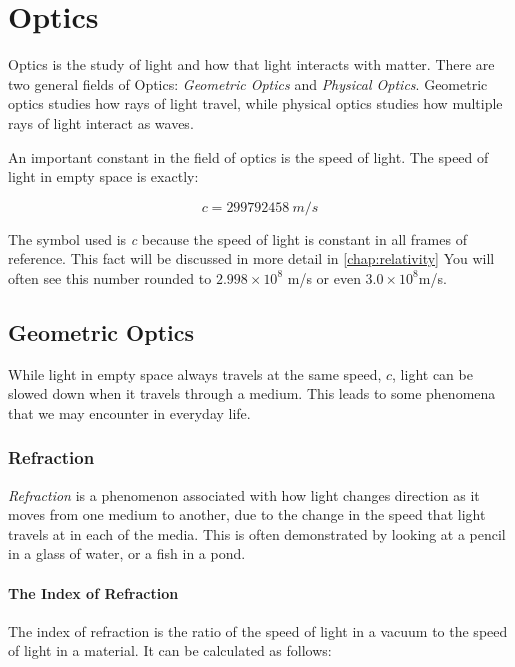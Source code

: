 \chapter{Optics}
	 Optics is the study of light and how that light interacts with matter.  There are two general fields of Optics: \textit{Geometric Optics} and \textit{Physical Optics}. Geometric optics studies how rays of light travel, while physical optics studies how multiple rays of light interact as waves.  
	
	An important constant in the field of optics is the speed of light.  The speed of light in empty space is exactly:	
	\begin{mdframed}[backgroundcolor=green!20!white]
		\begin{equation*}
		c = \SI{299792458}{m/s}
		\label{equation:speedoflight}
		\end{equation*}
	\end{mdframed}	
	
	The symbol used is \textit{c} because the speed of light is constant in all frames of reference.  This fact will be discussed in more detail in \cref{chap:relativity} \color{black} You will often see this number rounded to $2.998 \times 10^8$ m/s or even $3.0 \times 10^8 $m/s.
	
	
	
	
	\section{Geometric Optics} 
	
	While light in empty space always travels at the same speed, $c$, light can be slowed down when it travels through a medium.  This leads to some phenomena that we may encounter in everyday life.  
	

	\subsection{Refraction} 
		
	\textit{Refraction} is a phenomenon associated with how light changes direction as it moves from one medium to another, due to the change in the speed that light travels at in each of the media.  This is often demonstrated by looking at a pencil in a glass of water, or a fish in a pond.  
	
	\subsubsection{The Index of Refraction}
	The index of refraction  is the ratio of the speed of light in a vacuum to the speed of light in a material.  It can be calculated as follows:
	
